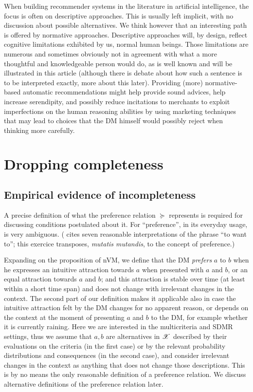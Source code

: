 \documentclass[french, english]{llncs}
\begin{document}
When building recommender systems in the literature in artificial intelligence, the focus is often on descriptive approaches. This is usually left implicit, with no discussion about possible alternatives. We think however that an interesting path is offered by normative approaches. Descriptive approaches will, by design, reflect cognitive limitations exhibited by us, normal human beings. Those limitations are numerous and sometimes obviously not in agreement with what a more thoughtful and knowledgeable person would do, as is well known and will be illustrated in this article (although there is debate about how such a sentence is to be interpreted exactly, more about this later). Providing (more) normative-based automatic recommendations might help provide sound advices, help increase serendipity, and possibly reduce incitations to merchants to exploit imperfections on the human reasoning abilities by using marketing techniques that may lead to choices that the \ac{DM} himself would possibly reject when thinking more carefully.

\section{Dropping completeness}

\subsection{Empirical evidence of incompleteness}
A precise definition of what the preference relation $\succeq$ represents is required for discussing conditions postulated about it. For “preference”, in its everyday usage, is very ambiguous. (\citet{frankfurt_freedom_1971} cites seven reasonable interpretations of the phrase “to want to”; this exercice transposes, \emph{mutatis mutandis}, to the concept of preference.)

Expanding on the proposition of nVM, we define that the \ac{DM} \emph{prefers} $a$ to $b$ when he expresses an intuitive attraction towards $a$ when presented with $a$ and $b$, or an equal attraction towards $a$ and $b$; and this attraction is stable over time (at least within a short time span) and does not change with irrelevant changes in the context. The second part of our definition makes it applicable also in case the intuitive attraction felt by the \ac{DM} changes for no apparent reason, or depends on the context at the moment of presenting $a$ and $b$ to the \ac{DM}, for example whether it is currently raining. Here we are interested in the multicriteria and SDMR settings, thus we assume that $a, b$ are alternatives in $\mathscr{X}$ described by their evaluations on the criteria (in the first case) or by the relevant probability distributions and consequences (in the second case), and consider irrelevant changes in the context as anything that does not change those descriptions. 
This is by no means the only reasonable definition of a preference relation. We discuss alternative definitions of the preference relation later.
\end{document}
